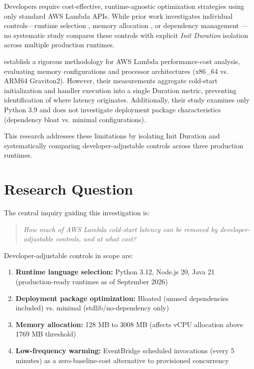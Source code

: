 Developers require cost-effective, runtime-agnostic optimization strategies using only standard AWS Lambda APIs. While prior work investigates individual controls—runtime selection \citep{wen2023characterizing}, memory allocation \citep{bluemke2025ijet}, or dependency management \citep{dantas2022deployment}—no systematic study compares these controls with explicit \textit{Init Duration} isolation across multiple production runtimes.

\citet{bluemke2025ijet} establish a rigorous methodology for AWS Lambda performance-cost analysis, evaluating memory configurations and processor architectures (x86\_64 vs. ARM64 Graviton2). However, their measurements aggregate cold-start initialization and handler execution into a single Duration metric, preventing identification of where latency originates. Additionally, their study examines only Python 3.9 and does not investigate deployment package characteristics (dependency bloat vs. minimal configurations).

This research addresses these limitations by isolating Init Duration and systematically comparing developer-adjustable controls across three production runtimes.

\section{Research Question}

The central inquiry guiding this investigation is:

\begin{quote}
\textit{How much of AWS Lambda cold-start latency can be removed by developer-adjustable controls, and at what cost?}
\end{quote}

Developer-adjustable controls in scope are:

\begin{enumerate}
    \item \textbf{Runtime language selection:} Python 3.12, Node.js 20, Java 21 (production-ready runtimes as of September 2026)
    \item \textbf{Deployment package optimization:} Bloated (unused dependencies included) vs. minimal (stdlib/no-dependency only)
    \item \textbf{Memory allocation:} 128 MB to 3008 MB (affects vCPU allocation above 1769 MB threshold)
    \item \textbf{Low-frequency warming:} EventBridge scheduled invocations (every 5 minutes) as a zero-baseline-cost alternative to provisioned concurrency
\end{enumerate}

